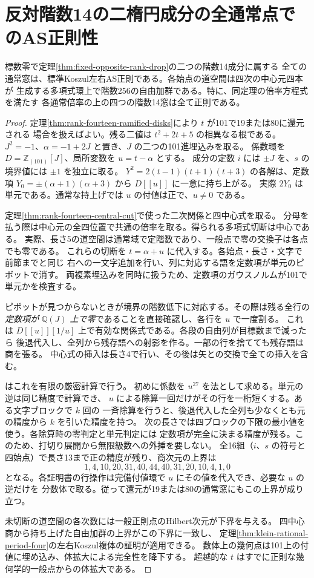 \section{反対階数14の二楕円成分の全通常点でのAS正則性}
\label{sec:rank-fourteen-all-ordinary}
\begin{theorem}\label{thm:rank-fourteen-all-ordinary}
標数零で定理\ref{thm:fixed-opposite-rank-drop}の二つの階数14成分に属する
全ての通常窓は、標準Koszul左右AS正則である。各始点の道空間は四次の中心元四本が
生成する多項式環上で階数256の自由加群である。特に、同定理の倍率方程式を満たす
各通常倍率の上の四つの階数14窓は全て正則である。
\end{theorem}
\begin{proof}
定理\ref{thm:rank-fourteen-ramified-disks}により $t$ が101で19または80に還元される
場合を扱えばよい。残る二値は $t^2+2t+5$ の相異なる根である。
$J^2=-1$、$\alpha=-1+2J$ と置き、$J$ の二つの101進埋込みを取る。
係数環を $D=\mathbb Z_{(101)}[J]$、局所変数を $u=t-\alpha$ とする。
成分の定数 $i$ には $\pm J$ を、$s$ の境界値には $\pm1$ を独立に取る。
$Y^2=2(t-1)(t+1)(t+3)$ の各解は、定数項
$Y_0=\pm(\alpha+1)(\alpha+3)$ から $D[[u]]$ に一意に持ち上がる。
実際 $2Y_0$ は単元である。通常な持上げでは $u$ の付値は正で、$u\ne0$ である。

定理\ref{thm:rank-fourteen-central-cut}で使った二次関係と四中心式を取る。
分母を払う際は中心元の全四位置で共通の倍率を取る。得られる多項式切断は中心である。
実際、長さ5の道空間は通常域で定階数であり、一般点で零の交換子は各点でも零である。
これらの切断を $t=\alpha+u$ に代入する。各始点・長さ・文字で前節までと同じ
右への一文字追加を行い、列に対応する語を定数項が単元のピボットで消す。
両複素埋込みを同時に扱うため、定数項のガウスノルムが101で単元かを検査する。

ピボットが見つからないときが境界の階数低下に対応する。その際は残る全行の
\emph{定数項が $\mathbb Q(J)$ 上で零}であることを直接確認し、各行を $u$ で一度割る。
これは $D[[u]][1/u]$ 上で有効な関係式である。各段の自由列が目標数まで減ったら
後退代入し、全列から残存語への射影を作る。一部の行を捨てても残存語は商を張る。
中心式の挿入は長さ4で行い、その後は矢との交換で全ての挿入を含む。

 はこれを有限の厳密計算で行う。
初めに係数を $u^{27}$ を法として求める。単元の逆は同じ精度で計算でき、
$u$ による除算一回だけがその行を一桁短くする。ある文字ブロックで $k$ 回の
一斉除算を行うと、後退代入した全列も少なくとも元の精度から $k$ を引いた精度を持つ。
次の長さでは四ブロックの下限の最小値を使う。各除算時の零判定と単元判定には
定数項が完全に決まる精度が残る。このため、打切り展開から無限級数への外挿を要しない。
全16組（$i$、$s$ の符号と四始点）で長さ13まで正の精度が残り、商次元の上界は
\[
 1,4,10,20,31,40,44,40,31,20,10,4,1,0
\]
となる。各証明書の行操作は完備付値環で $u$ にその値を代入でき、必要な $u$ の逆だけを
分数体で取る。従って還元が19または80の通常窓にもこの上界が成り立つ。

未切断の道空間の各次数には一般正則点のHilbert次元が下界を与える。
四中心商から持ち上げた自由加群の上界がこの下界に一致し、
定理\ref{thm:klein-rational-period-four}の左右Koszul複体の証明が適用できる。
数体上の幾何点は101上の付値に埋め込み、体拡大による完全性を降下する。
超越的な $t$ はすでに正則な幾何学的一般点からの体拡大である。
\end{proof}
